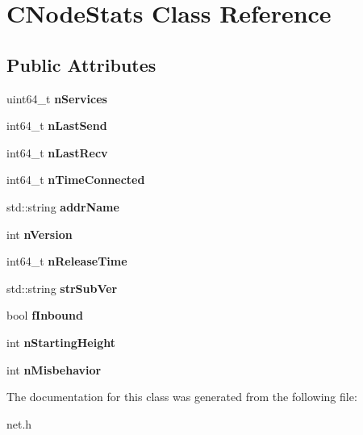 \hypertarget{class_c_node_stats}{}\section{C\+Node\+Stats Class Reference}
\label{class_c_node_stats}
\subsection*{Public Attributes}
\begin{DoxyCompactItemize}
\item 
\mbox{\label{class_c_node_stats_a3c56fe96daccb9339314953d249dfa15}} 
uint64\+\_\+t {\bfseries n\+Services}
\item 
\mbox{\label{class_c_node_stats_adc88b64389f26227db58ed86058d2e1a}} 
int64\+\_\+t {\bfseries n\+Last\+Send}
\item 
\mbox{\label{class_c_node_stats_a67b3cd5817ad20bfb2d9eb1583f1deb5}} 
int64\+\_\+t {\bfseries n\+Last\+Recv}
\item 
\mbox{\label{class_c_node_stats_a3d5133369e51db3c45839c8a68c662d1}} 
int64\+\_\+t {\bfseries n\+Time\+Connected}
\item 
\mbox{\label{class_c_node_stats_a3299ecdae870c367fe657f3f59b27e43}} 
std\+::string {\bfseries addr\+Name}
\item 
\mbox{\label{class_c_node_stats_ac8892d29d7c246e34e78fbc15ae77276}} 
int {\bfseries n\+Version}
\item 
\mbox{\label{class_c_node_stats_a61775af58a27a5a062cf80afd3122b13}} 
int64\+\_\+t {\bfseries n\+Release\+Time}
\item 
\mbox{\label{class_c_node_stats_a9029626f81544ffe6727cf63a091974f}} 
std\+::string {\bfseries str\+Sub\+Ver}
\item 
\mbox{\label{class_c_node_stats_a34627c46cac7bc2bfb3406c954522b49}} 
bool {\bfseries f\+Inbound}
\item 
\mbox{\label{class_c_node_stats_a86ff627e31f8ab881a8e11bb3acf4f19}} 
int {\bfseries n\+Starting\+Height}
\item 
\mbox{\label{class_c_node_stats_ae5c21d0bb707eff8e43174078c1a1a00}} 
int {\bfseries n\+Misbehavior}
\end{DoxyCompactItemize}


The documentation for this class was generated from the following file\+:\begin{DoxyCompactItemize}
\item 
net.\+h\end{DoxyCompactItemize}
